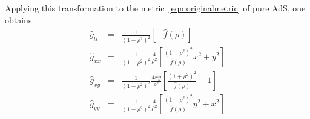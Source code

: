 \documentclass[prl,twocolumn,superscriptaddress]{revtex4-1}
\begin{document}
Applying this transformation to the metric~\eqref{eqn:originalmetric} of pure AdS, one obtains
\begin{eqnarray}\label{eqn:cartesianmetric_components}
\hat{g}_{tt} &=& \frac{1}{(1-\rho^2)^2} \left[ -\hat{f}(\rho) \right] \nonumber \\
\hat{g}_{xx} &=& \frac{1}{(1-\rho^2)^2} \frac{4}{\rho^2} \left[ \frac{(1+\rho^2)^2}{\hat{f}(\rho)} x^2 + y^2 \right] \nonumber \\
\hat{g}_{xy} &=& \frac{1}{(1-\rho^2)^2} \frac{4xy}{\rho^2} \left[ \frac{(1+\rho^2)^2}{\hat{f}(\rho)} - 1 \right] \nonumber \\
\hat{g}_{yy} &=& \frac{1}{(1-\rho^2)^2} \frac{4}{\rho^2} \left[ \frac{(1+\rho^2)^2}{\hat{f}(\rho)} y^2 + x^2 \right] \nonumber \\
\end{eqnarray}



\end{document}
